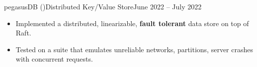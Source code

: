 \begin{cvsubsection}{pegasusDB \normalfont(\href{ https://github.com/a3y3/pegasusDB}{})}{Distributed Key/Value Store}{June 2022 -- July 2022}
	\begin{itemize}
        \item Implemented a distributed, linearizable, \textbf{fault tolerant} data store on top of Raft.
        \item Tested on a suite that emulates unreliable networks, partitions, server crashes with concurrent requests.
	\end{itemize}
\end{cvsubsection}